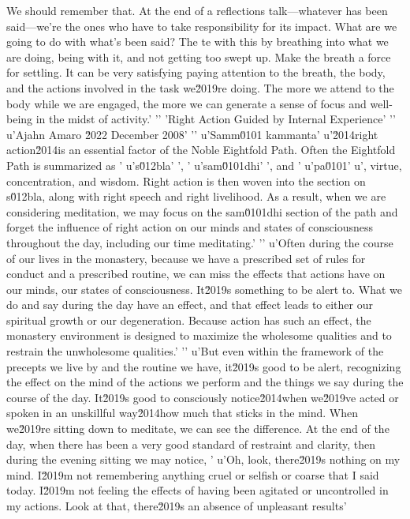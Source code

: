 We should remember that. At the end of a reflections talk---whatever 
has been said---we're the ones who have to take responsibility for its 
impact. What are we going to do with what's been said? The te with this by breathing into what we are doing, being with it, and not getting too swept up. Make the breath a force for settling. It can be very satisfying paying attention to the breath, the body, and the actions involved in the task we\u2019re doing. The more we attend to the body while we are engaged, the more we can generate a sense of focus and well-being in the midst of activity.'
'\n'
'Right Action Guided by Internal Experience'
'\n'
u'Ajahn Amaro \u2022 December 2008'
'\n'
u'Samm\u0101 kammanta'
u'\u2014right action\u2014is an essential factor of the Noble Eightfold Path. Often the Eightfold Path is summarized as '
u's\u012bla'
', '
u'sam\u0101dhi'
', and '
u'pa\u0101'
u', virtue, concentration, and wisdom. Right action is then woven into the section on s\u012bla, along with right speech and right livelihood. As a result, when we are considering meditation, we may focus on the sam\u0101dhi section of the path and forget the influence of right action on our minds and states of consciousness throughout the day, including our time meditating.'
'\n'
u'Often during the course of our lives in the monastery, because we have a prescribed set of rules for conduct and a prescribed routine, we can miss the effects that actions have on our minds, our states of consciousness. It\u2019s something to be alert to. What we do and say during the day have an effect, and that effect leads to either our spiritual growth or our degeneration. Because action has such an effect, the monastery environment is designed to maximize the wholesome qualities and to restrain the unwholesome qualities.'
'\n'
u'But even within the framework of the precepts we live by and the routine we have, it\u2019s good to be alert, recognizing the effect on the mind of the actions we perform and the things we say during the course of the day. It\u2019s good to consciously notice\u2014when we\u2019ve acted or spoken in an unskillful way\u2014how much that sticks in the mind. When we\u2019re sitting down to meditate, we can see the difference. At the end of the day, when there has been a very good standard of restraint and clarity, then during the evening sitting we may notice, '
u'Oh, look, there\u2019s nothing on my mind. I\u2019m not remembering anything cruel or selfish or coarse that I said today. I\u2019m not feeling the effects of having been agitated or uncontrolled in my actions. Look at that, there\u2019s an absence of unpleasant results'
